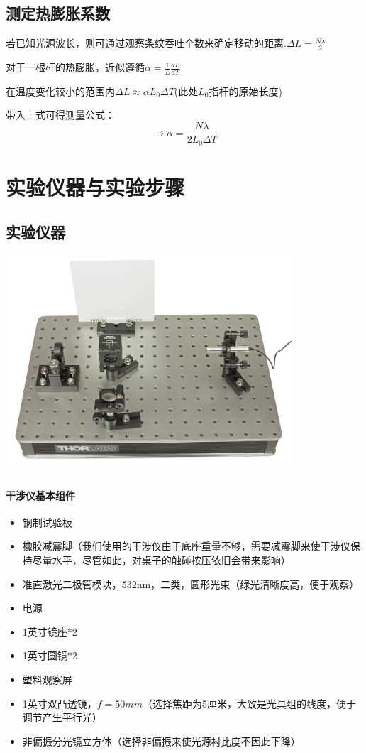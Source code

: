 \documentclass[10pt]{ctexart}
\begin{document}
\subsection{测定热膨胀系数}
若已知光源波长，则可通过观察条纹吞吐个数来确定移动的距离.$\Delta L = \frac{N\lambda}{2}$

对于一根杆的热膨胀，近似遵循$\alpha=\frac{1}{L}\frac{dL}{dT}$

在温度变化较小的范围内$\Delta L\approx \alpha L_0 \Delta T$(此处$L_0$指杆的原始长度)

带入上式可得测量公式：
\[\rightarrow \alpha=\frac{N\lambda}{2L_0\Delta T}\]

\section{实验仪器与实验步骤}
\subsection{实验仪器}

\vspace{10pt}

\begin{minipage}{\textwidth} 
    \includegraphics[width=0.8\textwidth]{基础光路图.jpg}
\end{minipage}

\paragraph{干涉仪基本组件}

\begin{itemize}
    \item 钢制试验板
    \item 橡胶减震脚（我们使用的干涉仪由于底座重量不够，需要减震脚来使干涉仪保持尽量水平，尽管如此，对桌子的触碰按压依旧会带来影响）
    \item 准直激光二极管模块，532nm，二类，圆形光束（绿光清晰度高，便于观察）
    \item 电源
    \item 1英寸镜座*2
    \item 1英寸圆镜*2
    \item 塑料观察屏
    \item 1英寸双凸透镜，$f=50mm$（选择焦距为5厘米，大致是光具组的线度，便于调节产生平行光）
    \item 非偏振分光镜立方体（选择非偏振来使光源衬比度不因此下降）
\end{itemize}
\end{document}
